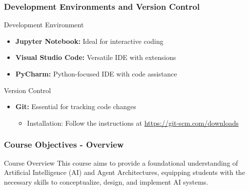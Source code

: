 \documentclass[aspectratio=169]{beamer}
\begin{document}
\begin{frame}[fragile]
    \frametitle{Development Environments and Version Control}
    \begin{block}{Development Environment}
        \begin{itemize}
            \item \textbf{Jupyter Notebook:} Ideal for interactive coding
            \item \textbf{Visual Studio Code:} Versatile IDE with extensions
            \item \textbf{PyCharm:} Python-focused IDE with code assistance
        \end{itemize}
    \end{block}

    \begin{block}{Version Control}
        \begin{itemize}
            \item \textbf{Git:} Essential for tracking code changes
            \begin{itemize}
                \item Installation: Follow the instructions at \url{https://git-scm.com/downloads}
            \end{itemize}
        \end{itemize}
    \end{block}

\end{frame}

\begin{frame}
    \frametitle{Course Objectives - Overview}
    \begin{block}{Course Overview}
    This course aims to provide a foundational understanding of Artificial Intelligence (AI) and Agent Architectures, equipping students with the necessary skills to conceptualize, design, and implement AI systems.
    \end{block}
\end{frame}
\end{document}
